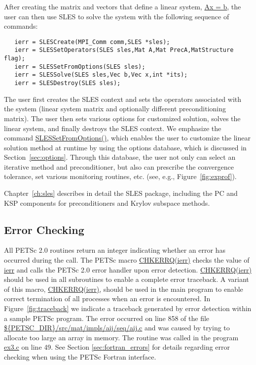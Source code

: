 After creating the matrix and vectors that define a linear system,
\url{Ax = b}, the user can then use SLES to solve the system 
with the following sequence of commands: 
 
  
\begin{verbatim}
   ierr = SLESCreate(MPI_Comm comm,SLES *sles); 
   ierr = SLESSetOperators(SLES sles,Mat A,Mat PrecA,MatStructure flag);
   ierr = SLESSetFromOptions(SLES sles);
   ierr = SLESSolve(SLES sles,Vec b,Vec x,int *its);
   ierr = SLESDestroy(SLES sles);
\end{verbatim}
The user first creates the SLES context and sets the operators
associated with the system (linear system matrix and optionally different
preconditioning matrix).  The user then sets various options for
customized solution, solves the linear system, and finally destroys
the SLES context.  We emphasize the command \url{SLESSetFromOptions()}, 
which enables the user to customize the linear solution
method at runtime by using the options database, which is discussed in
Section~\ref{sec:options}. Through this database, the user not only
can select an iterative method and preconditioner, but also can prescribe
the convergence tolerance, set various monitoring routines, etc.
(see, e.g., Figure~\ref{fig:exprof}).

Chapter~\ref{ch:sles} describes in detail the SLES package, including
the PC and KSP components for preconditioners and Krylov subspace methods.

\subsection*{Error Checking}

All PETSc 2.0 routines return an integer indicating whether an error
has occurred during the call.  The PETSc macro \url{CHKERRQ(ierr)}
checks the value of \url{ierr} and calls the PETSc 2.0 error handler
upon error detection.  \url{CHKERRQ(ierr)} should be used in all
subroutines to enable a complete error traceback.  A variant of this
macro, \url{CHKERRQ(ierr)}, should be used in the main program to
enable correct termination of all processes when an error is
encountered.  In Figure~\ref{fig:traceback} we indicate a
traceback generated by error detection within a sample PETSc
program. The error occurred on line 858 of the file \url{
${PETSC_DIR}/src/mat/impls/aij/seq/aij.c} and was caused by trying to allocate too
large an array in memory. The routine was called in the program 
\url{ex3.c} on line 49.  See Section \ref{sec:fortran_errors} for
details regarding error checking when using the PETSc Fortran interface.

